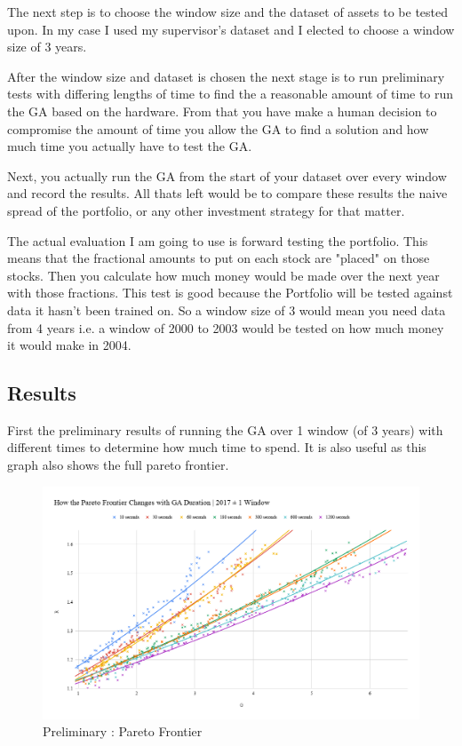 \documentclass[11pt]{article}
\begin{document}
    The next step is to choose the window size and the dataset of assets to be tested upon.
    In my case I used my supervisor's dataset \cite{Dataset} and I elected to choose a window
    size of 3 years.

    After the window size and dataset is chosen the next stage is to run preliminary tests with
    differing lengths of time to find the a reasonable amount of time to run the GA based on
    the hardware. From that you have make a human decision to compromise the amount of time
    you allow the GA to find a solution and how much time you actually have to test the GA.

    Next, you actually run the GA from the start of your dataset over every window and record
    the results. All thats left would be to compare these results the naive spread of the
    portfolio, or any other investment strategy for that matter.

    The actual evaluation I am going to use is forward testing the portfolio. This means that
    the fractional amounts to put on each stock are "placed" on those stocks. Then you
    calculate how much money would be made over the next year with those fractions. This test
    is good because the Portfolio will be tested against data it hasn't been trained on.
    So a window size of 3 would mean you need data from 4 years i.e. a window of 2000 to 2003
    would be tested on how much money it would make in 2004.

\subsection{Results}

    First the preliminary results of running the GA over 1 window (of 3 years) with different
    times to determine how much time to spend. It is also useful as this graph also shows
    the full pareto frontier.

    \begin{figure}[H] %
        \includegraphics[width=\textwidth]{HowTheParetoFrontierChangesWithGADuration_2017-1Window}
        \caption{Preliminary : Pareto Frontier}
            \label{fig:HowTheParetoFrontierChangesWithGADuration_2017-1Window}
    \end{figure}
\end{document}
